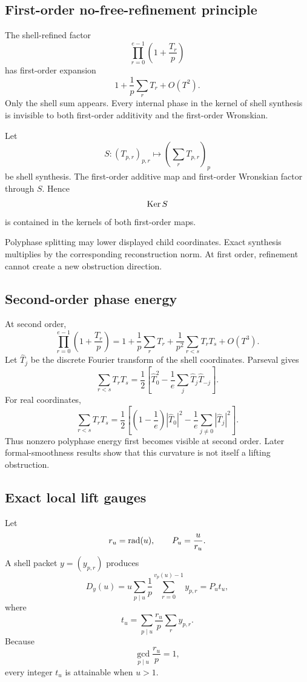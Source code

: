 \subsection{First-order no-free-refinement principle}
The shell-refined factor
\[
 \prod_{r=0}^{e-1}
 \left(1+\frac{T_r}{p}\right)
\]
has first-order expansion
\[
 1+\frac1p\sum_rT_r+O(T^2).
\]
Only the shell sum appears. Every internal phase in the kernel of shell synthesis is invisible to both first-order additivity and the first-order Wronskian.

\begin{theorem}
Let
\[
 S:(T_{p,r})_{p,r}\longmapsto
 \left(\sum_rT_{p,r}\right)_p
\]
be shell synthesis. The first-order additive map and first-order Wronskian factor through $S$. Hence
\[
 \operatorname{Ker} S
\]
is contained in the kernels of both first-order maps.
\end{theorem}

Polyphase splitting may lower displayed child coordinates. Exact synthesis multiplies by the corresponding reconstruction norm. At first order, refinement cannot create a new obstruction direction.

\subsection{Second-order phase energy}
At second order,
\[
 \prod_{r=0}^{e-1}
 \left(1+\frac{T_r}{p}\right)
 =
 1+
 \frac1p\sum_rT_r+
 \frac1{p^2}\sum_{r<s}T_rT_s+
 O(T^3).
\]
Let $\widehat T_j$ be the discrete Fourier transform of the shell coordinates. Parseval gives
\[
 \sum_{r<s}T_rT_s
 =
 \frac12\left[
 \widehat T_0^2
 -
 \frac1e\sum_j
 \widehat T_j\widehat T_{-j}
 \right].
\]
For real coordinates,
\[
 \sum_{r<s}T_rT_s
 =
 \frac12\left[
 \left(1-\frac1e\right)|\widehat T_0|^2
 -
 \frac1e\sum_{j\neq0}|\widehat T_j|^2
 \right].
\]
Thus nonzero polyphase energy first becomes visible at second order. Later formal-smoothness results show that this curvature is not itself a lifting obstruction.

\subsection{Exact local lift gauges}
Let
\[
 r_u=\operatorname{rad}(u),
 \qquad
 P_u=\frac{u}{r_u}.
\]
A shell packet $y=(y_{p,r})$ produces
\[
 D_y(u)
 =
 u\sum_{p\mid u}\frac1p
 \sum_{r=0}^{v_p(u)-1}y_{p,r}
 =P_ut_u,
\]
where
\[
 t_u=
 \sum_{p\mid u}
 \frac{r_u}{p}
 \sum_r y_{p,r}.
\]
Because
\[
 \gcd_{p\mid u}\frac{r_u}{p}=1,
\]
every integer $t_u$ is attainable when $u>1$.

